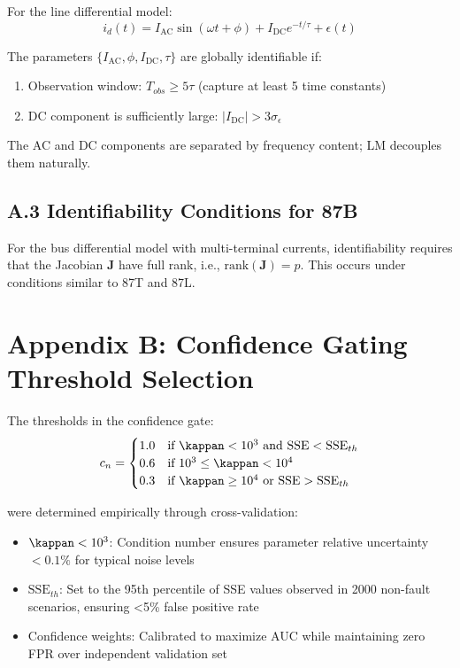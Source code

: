 For the line differential model:
$$i_d(t) = I_{\text{AC}} \sin(\omega t + \phi) + I_{\text{DC}} e^{-t/\tau} + \epsilon(t)$$

The parameters $\{I_{\text{AC}}, \phi, I_{\text{DC}}, \tau\}$ are globally identifiable if:

\begin{enumerate}
    \item Observation window: $T_{obs} \geq 5\tau$ (capture at least 5 time constants)
    \item DC component is sufficiently large: $|I_{\text{DC}}| > 3\sigma_\epsilon$
\end{enumerate}

The AC and DC components are separated by frequency content; LM decouples them naturally.

\subsection*{A.3 Identifiability Conditions for 87B}

For the bus differential model with multi-terminal currents, identifiability requires 
that the Jacobian $\mathbf{J}$ have full rank, i.e., $\text{rank}(\mathbf{J}) = p$. 
This occurs under conditions similar to 87T and 87L.


\section*{Appendix B: Confidence Gating Threshold Selection}

The thresholds in the confidence gate:
$$c_n = \begin{cases}
1.0 & \text{if } \kappan < 10^3 \text{ and } \text{SSE} < \text{SSE}_{th} \\
0.6 & \text{if } 10^3 \leq \kappan < 10^4 \\
0.3 & \text{if } \kappan \geq 10^4 \text{ or } \text{SSE} > \text{SSE}_{th}
\end{cases}$$

were determined empirically through cross-validation:

\begin{itemize}
    \item $\kappan < 10^3$: Condition number ensures parameter relative uncertainty $< 0.1\%$ for 
    typical noise levels
    \item $\text{SSE}_{th}$: Set to the 95th percentile of SSE values observed in 2000 
    non-fault scenarios, ensuring <5\% false positive rate
    \item Confidence weights: Calibrated to maximize AUC while maintaining zero FPR 
    over independent validation set
\end{itemize}

